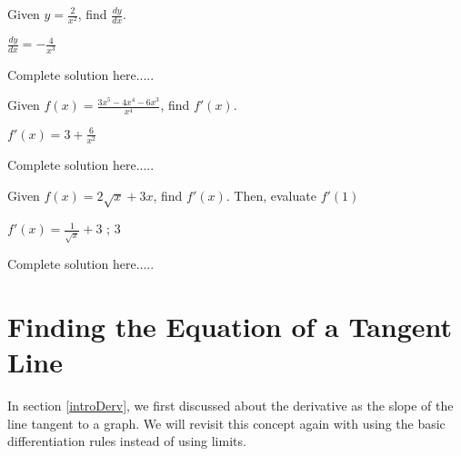 \begin{example}\label{exBasicRules1}
Given $y=\displaystyle \frac{2}{x^2}$, find $\displaystyle\frac{dy}{dx}$.
    \begin{sol}
    $\displaystyle\frac{dy}{dx}=-\frac{4}{x^3}$
    \end{sol}
    \begin{solL}
    Complete solution here.....
    
    \end{solL}
    
\end{example}
\vspace{1in}
\begin{example}\label{exBasicRules2}
Given $f(x)=\displaystyle\frac{3x^5-4x^4-6x^3}{x^4}$, find $f'(x)$.
    \begin{sol}
    $f'(x)=3+\displaystyle\frac{6}{x^2}$
    \end{sol}
    \begin{solL}
    Complete solution here.....
    
    \end{solL}
    
\end{example}
\vspace{1.2in}
\begin{example}\label{exBasicRules3}
Given $f(x)=2\sqrt{x}+3x$, find $f'(x)$. Then, evaluate $f'(1)$
    \begin{sol}
    $f'(x)=\displaystyle\frac{1}{\sqrt{x}}+3$ ; 3
    \end{sol}
    \begin{solL}
    Complete solution here.....
    
    \end{solL}
    
\end{example}
\newpage
\section*{Finding the Equation of a Tangent Line}
In section \ref{introDerv}, we first discussed about the derivative as the slope of the line tangent to a graph. We will revisit this concept again with using the basic differentiation rules instead of using limits.

